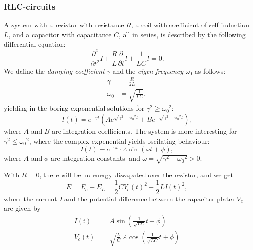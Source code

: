 \documentclass[a4paper, 12pt]{article}
\begin{document}
        \subsubsection{RLC-circuits}
            A system with a resistor with resistance $R$, a coil with coefficient of self induction $L$, and a capacitor with capacitance $C$, 
            all in series, is described by the following differential equation: 
            \begin{equation} \label{Current in RLC}
                \frac{\partial^2}{\partial t^2}I + \frac{R}{L}\frac{\partial}{\partial t}I + \frac{1}{LC}I = 0.
            \end{equation}
            We define the \textit{damping coefficient} $\gamma$ and the \textit{eigen frequency} $\omega_0$ as follows:
            \begin{align*}
                \gamma &= \frac{R}{2L}\\
                \omega_0 &= \sqrt{\frac{1}{LC}},
            \end{align*}
            yielding in the boring exponential solutions for $\gamma^2 \geq {\omega_0}^2$:
            \begin{equation}
                I(t) = e^{-\gamma t}\left(Ae^{\sqrt{\gamma^2 - {\omega_0}^2}t}+Be^{-\sqrt{\gamma^2 - {\omega_0}^2}t}\right),
            \end{equation}
            where $A$ and $B$ are integration coefficients. The system is more interesting for $\gamma^2 \leq {\omega_0}^2$,
            where the complex exponential yields oscilating behaviour:
            \begin{equation}
                I(t) = e^{-\gamma t}\cdot A\sin\left(\omega t + \phi\right),
            \end{equation}
            where $A$ and $\phi$ are integration constants, and $\omega = \sqrt{\gamma^2 - {\omega_0}^2} > 0$.

            With $R=0$, there will be no energy dissapated over the resistor, and we get 
            \begin{equation*}
                E = E_c + E_L = \frac{1}{2}C{V_c(t)}^2 + \frac{1}{2}L{I(t)}^2,
            \end{equation*}
            where the current $I$ and the potential difference between the capacitor plates $V_c$ are given by 
            \begin{align*}
                I(t) &= A\sin\left(\frac{1}{\sqrt{LC}}t + \phi\right) \\
                V_c (t) &= \sqrt{\frac{L}{C}} \, A\cos\left(\frac{1}{\sqrt{LC}}t + \phi\right)
            \end{align*}
\end{document}
